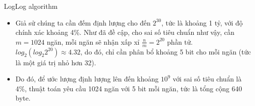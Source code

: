 \documentclass[10pt]{beamer}
\begin{document}
\begin{frame}{LogLog algorithm}
\begin{itemize}
  \item Giả sử chúng ta cần đếm định lượng cho đến $2^{30}$, tức là khoảng 1 tỷ, với độ chính xác khoảng 4\%. Như đã đề cập, cho sai số tiêu chuẩn như vậy, 
cần $m = 1024$ ngăn, mỗi ngăn sẽ nhận xấp xỉ $\frac{n}{m} = 2^{20}$ phần tử.
$log_2\left(log_{2}2^{20}\right) \approx 4.32$, do đó, chỉ cần phân bổ khoảng 5 bit cho mỗi ngăn (tức là một giá trị nhỏ hơn 32).
	\item Do đó, để ước lượng định lượng lên đến khoảng $10^9$ với sai số tiêu chuẩn là 4\%, thuật toán yêu cầu 1024 ngăn với 5 bit mỗi ngăn, 
tức là tổng cộng 640 byte.
\end{itemize}
\end{frame}
\end{document}
